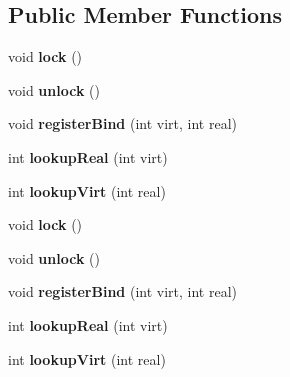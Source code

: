 \subsection*{Public Member Functions}
\begin{DoxyCompactItemize}
\item 
\hypertarget{classPortVirtualizer_a293b8d969b089b75f9518fe7763dde5e}{void {\bfseries lock} ()}\label{classPortVirtualizer_a293b8d969b089b75f9518fe7763dde5e}

\item 
\hypertarget{classPortVirtualizer_ade38fd411305855044c46ea5b546ef30}{void {\bfseries unlock} ()}\label{classPortVirtualizer_ade38fd411305855044c46ea5b546ef30}

\item 
\hypertarget{classPortVirtualizer_a7df3a1d6f23bdee92539ffab422a62b4}{void {\bfseries register\-Bind} (int virt, int real)}\label{classPortVirtualizer_a7df3a1d6f23bdee92539ffab422a62b4}

\item 
\hypertarget{classPortVirtualizer_af1a59f9efee9c4d6427b3d3857bf4622}{int {\bfseries lookup\-Real} (int virt)}\label{classPortVirtualizer_af1a59f9efee9c4d6427b3d3857bf4622}

\item 
\hypertarget{classPortVirtualizer_a7081d9f90d5e7226cfd41864027f0b1c}{int {\bfseries lookup\-Virt} (int real)}\label{classPortVirtualizer_a7081d9f90d5e7226cfd41864027f0b1c}

\item 
\hypertarget{classPortVirtualizer_a293b8d969b089b75f9518fe7763dde5e}{void {\bfseries lock} ()}\label{classPortVirtualizer_a293b8d969b089b75f9518fe7763dde5e}

\item 
\hypertarget{classPortVirtualizer_ade38fd411305855044c46ea5b546ef30}{void {\bfseries unlock} ()}\label{classPortVirtualizer_ade38fd411305855044c46ea5b546ef30}

\item 
\hypertarget{classPortVirtualizer_a7df3a1d6f23bdee92539ffab422a62b4}{void {\bfseries register\-Bind} (int virt, int real)}\label{classPortVirtualizer_a7df3a1d6f23bdee92539ffab422a62b4}

\item 
\hypertarget{classPortVirtualizer_af1a59f9efee9c4d6427b3d3857bf4622}{int {\bfseries lookup\-Real} (int virt)}\label{classPortVirtualizer_af1a59f9efee9c4d6427b3d3857bf4622}

\item 
\hypertarget{classPortVirtualizer_a7081d9f90d5e7226cfd41864027f0b1c}{int {\bfseries lookup\-Virt} (int real)}\label{classPortVirtualizer_a7081d9f90d5e7226cfd41864027f0b1c}

\end{DoxyCompactItemize}


